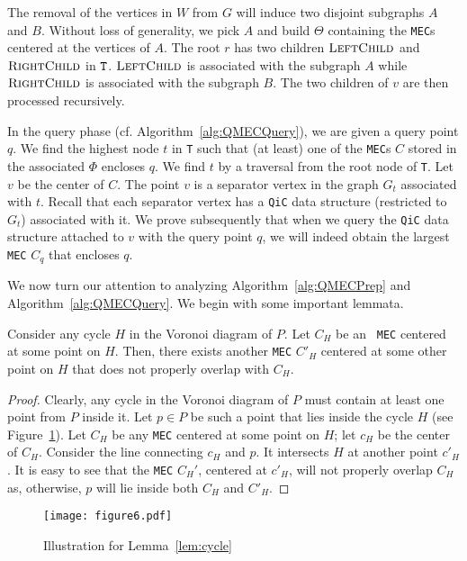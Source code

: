 \documentclass[12pt]{llncs}
\begin{document}
The removal of the  vertices in $W$ from $G$ will induce two disjoint subgraphs $A$ and $B$. Without loss of generality, we pick $A$  and build $\Theta$ 
containing the {\tt MEC}s centered at the vertices of $A$. The root $r$ 
has two children $\textsc{LeftChild}$ and $\textsc{RightChild}$ in ${\tt T}$. $\textsc{LeftChild}$ is associated with the 
 subgraph $A$ while  $\textsc{RightChild}$ is associated 
with 
the  subgraph $B$. The two children of $v$ are then
processed recursively. 

In the query phase (cf. Algorithm\ \ref{alg:QMECQuery}), we are given a query point $q$. We find the highest node $t$ in {\tt T} such that (at least) one of the {\tt MEC}s $C$ stored in the associated $\Phi$ encloses $q$. We find $t$ by a traversal from the root node of {\tt T}. Let $v$ be the center of $C$. The point $v$ is a separator vertex in the graph $G_t$ associated with $t$. Recall that each separator vertex has a {\tt QiC} data structure (restricted to $G_t$) associated with it. We prove subsequently that when we query the {\tt QiC} data structure attached to $v$ with the query point $q$, we will indeed obtain the largest {\tt MEC} $C_q$ that encloses $q$. 

We now turn our attention to analyzing Algorithm\ \ref{alg:QMECPrep} and Algorithm\ \ref{alg:QMECQuery}. We begin with some important lemmata.

\begin{lemma}\label{lem:cycle} 
Consider any cycle $H$ in the Voronoi diagram of $P$. Let $C_H$ be an {\tt 
MEC} centered at some point on $H$. Then, there exists another {\tt MEC} 
$C'_H$ centered at some other point on $H$ that does not properly overlap 
with $C_H$. 
\end{lemma}
\begin{proof}
Clearly, any cycle in the Voronoi diagram of $P$ must contain at 
least one point from $P$ inside it. Let $p \in P$ be such a  point
that lies inside the cycle $H$ (see Figure~\ref{fig:nspa}). Let $C_H$
be any {\tt MEC} centered at some point on $H$; let $c_H$ be the center of $C_H$.
Consider the line connecting $c_H$ and $p$. It intersects $H$ at
another point $c'_H$. It is easy to see that the {\tt MEC} $C_H'$, centered
at $c'_H$, will not properly overlap $C_H$ as, otherwise,
$p$ will lie inside both $C_H$ and $C'_H$. 
\end{proof}
\begin{figure}[h]
\begin{center} 
\texttt{[image: figure6.pdf]}\\

\end{center}

\caption{Illustration for Lemma~\ref{lem:cycle}}
\label{fig:nspa}
\end{figure}
\end{document}
